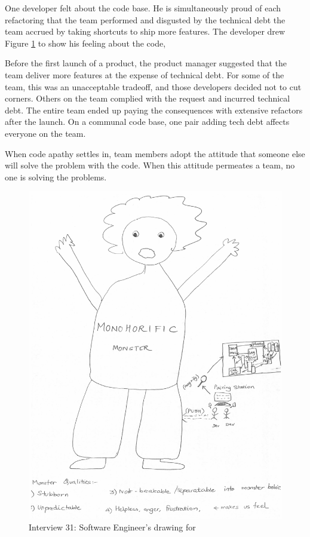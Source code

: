One developer felt  about the code base. He is simultaneously proud of each refactoring that the team performed and disgusted by the technical debt the team accrued by taking shortcuts to ship more features. The developer drew Figure \ref{Interview31} to show his feeling about the code, 

Before the first launch of a product, the product manager suggested that the team deliver more features at the expense of technical debt. For some of the team, this was an unacceptable tradeoff, and those developers decided not to cut corners. Others on the team complied with the request and incurred technical debt. The entire team ended up paying the consequences with extensive refactors after the launch. On a communal code base, one pair adding tech debt affects everyone on the team.

When code apathy settles in, team members adopt the attitude that someone else will solve the problem with the code. When this attitude permeates a team, no one is solving the problems. 

\begin{figure}[htbp]
\centering
\includegraphics[width=\oneColumnWidth{}]{drawings/2016_09_26.png}
\caption{Interview 31: Software Engineer's drawing for }
\label{Interview31}
\end{figure}

